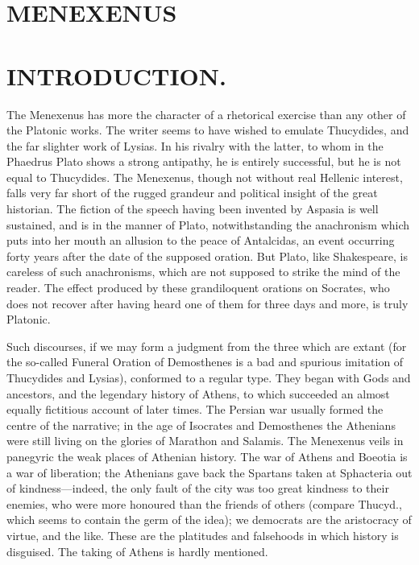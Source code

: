 \documentclass[11pt,letter]{article}
\begin{document}
\par 
\section{
      MENEXENUS
    }
\par 
\section{
      INTRODUCTION.
    }
\par  The Menexenus has more the character of a rhetorical exercise than any other of the Platonic works. The writer seems to have wished to emulate Thucydides, and the far slighter work of Lysias. In his rivalry with the latter, to whom in the Phaedrus Plato shows a strong antipathy, he is entirely successful, but he is not equal to Thucydides. The Menexenus, though not without real Hellenic interest, falls very far short of the rugged grandeur and political insight of the great historian. The fiction of the speech having been invented by Aspasia is well sustained, and is in the manner of Plato, notwithstanding the anachronism which puts into her mouth an allusion to the peace of Antalcidas, an event occurring forty years after the date of the supposed oration. But Plato, like Shakespeare, is careless of such anachronisms, which are not supposed to strike the mind of the reader. The effect produced by these grandiloquent orations on Socrates, who does not recover after having heard one of them for three days and more, is truly Platonic.

\par  Such discourses, if we may form a judgment from the three which are extant (for the so-called Funeral Oration of Demosthenes is a bad and spurious imitation of Thucydides and Lysias), conformed to a regular type. They began with Gods and ancestors, and the legendary history of Athens, to which succeeded an almost equally fictitious account of later times. The Persian war usually formed the centre of the narrative; in the age of Isocrates and Demosthenes the Athenians were still living on the glories of Marathon and Salamis. The Menexenus veils in panegyric the weak places of Athenian history. The war of Athens and Boeotia is a war of liberation; the Athenians gave back the Spartans taken at Sphacteria out of kindness—indeed, the only fault of the city was too great kindness to their enemies, who were more honoured than the friends of others (compare Thucyd., which seems to contain the germ of the idea); we democrats are the aristocracy of virtue, and the like. These are the platitudes and falsehoods in which history is disguised. The taking of Athens is hardly mentioned.
\end{document}
